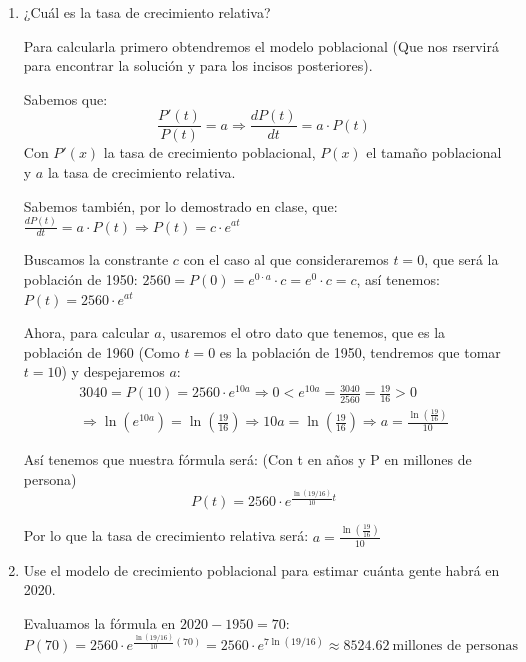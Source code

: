 \documentclass[12pt]{article}
\begin{document}
\begin{enumerate}[\hspace{9px} a)]
    \item ¿Cuál es la tasa de crecimiento relativa?\medskip
    
        Para calcularla primero obtendremos el modelo poblacional (Que nos rservir\'a para encontrar la soluci\'on y para los incisos posteriores).
    
        Sabemos que: 
        \[\frac{P'(t)}{P(t)}=a \Longrightarrow \frac{dP(t)}{dt}=a\cdot P(t)\]
        Con \(P'(x)\) la tasa de crecimiento poblacional, \(P(x)\) el tamaño poblacional y $a$ la tasa de crecimiento relativa.\medskip

        Sabemos también, por lo demostrado en clase, que: \(\displaystyle\frac{dP(t)}{dt}=a\cdot P(t) \Longrightarrow P(t)=c\cdot e^{at}\)\medskip

        Buscamos la constrante $c$ con el caso al que consideraremos \(t=0\), que ser\'a la poblaci\'on de 1950: \(2560=P(0)=e^{0\cdot a}\cdot c = e^0\cdot c = c\), as\'i tenemos: \(P(t)=2560\cdot e^{at}\)\medskip

        Ahora, para calcular $a$, usaremos el otro dato que tenemos, que es la poblaci\'on de 1960 (Como \(t=0\) es la poblaci\'on de 1950, tendremos que tomar \(t=10\)) y despejaremos $a$:
        \begin{multline*}
            3040=P(10)=2560\cdot e^{10a} \Longrightarrow 0<e^{10a}=\frac{3040}{2560}=\frac{19}{16}>0 \\\Longrightarrow \ln\left(e^{10a}\right)=\ln\left(\frac{19}{16}\right)\Longrightarrow 10a=\ln\left(\frac{19}{16}\right) \Longrightarrow a=\frac{\ln\left(\frac{19}{16}\right)}{10}
        \end{multline*}

        As\'i tenemos que nuestra f\'ormula ser\'a: (Con t en años y P en millones de persona)
        \[P(t)=2560\cdot e^{\frac{\ln\left(19/16\right)}{10}t}\]

        Por lo que la tasa de crecimiento relativa ser\'a: \(a = \displaystyle\frac{\ln\left(\frac{19}{16}\right)}{10}\)\medskip

    \item Use el modelo de crecimiento poblacional para estimar cuánta gente habrá en 2020.\medskip
    
        Evaluamos la f\'ormula en \(2020-1950=70\):
        \begin{equation*}
            P(70)=2560\cdot e^{\frac{\ln\left(19/16\right)}{10}(70)}=2560\cdot e^{7\ln\left(19/16\right)}\approx8524.62 \ \text{millones de personas}
        \end{equation*}


\end{enumerate}
\end{document}
